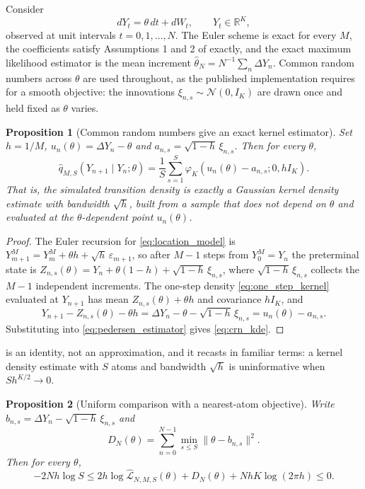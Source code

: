 \documentclass[11pt]{article}
\newtheorem{proposition}[proposition]{Proposition}
\theoremstyle{definition}
\newcommand{\R}{\mathbb{R}}
\newcommand{\Normal}{\mathcal{N}}
\newcommand{\phik}{\varphi_K}
\begin{document}
Consider
\begin{equation}\label{eq:location_model}
dY_t=\theta\,dt+dW_t,\qquad Y_t\in\R^K,
\end{equation}
observed at unit intervals $t=0,1,\ldots,N$. The Euler scheme is exact for every $M$, the coefficients satisfy Assumptions 1 and 2 of \citet{BrandtSantaClara2002} exactly, and the exact maximum likelihood estimator is the mean increment $\widehat\theta_N=N^{-1}\sum_n\Delta Y_n$. Common random numbers across $\theta$ are used throughout, as the published implementation requires for a smooth objective: the innovations $\xi_{n,s}\sim\Normal(0,I_K)$ are drawn once and held fixed as $\theta$ varies.

\begin{proposition}[Common random numbers give an exact kernel estimator]\label{prop:crn_kde}
Set $h=1/M$, $u_n(\theta)=\Delta Y_n-\theta$ and $a_{n,s}=\sqrt{1-h}\,\xi_{n,s}$. Then for every $\theta$,
\begin{equation}\label{eq:crn_kde}
\widehat q_{M,S}(Y_{n+1}\mid Y_n;\theta)
=\frac1S\sum_{s=1}^S\phik\!\left(u_n(\theta)-a_{n,s};0,hI_K\right).
\end{equation}
That is, the simulated transition density is exactly a Gaussian kernel density estimate with bandwidth $\sqrt h$, built from a sample that does not depend on $\theta$ and evaluated at the $\theta$-dependent point $u_n(\theta)$.
\end{proposition}

\begin{proof}
The Euler recursion for \eqref{eq:location_model} is $Y^M_{m+1}=Y^M_m+\theta h+\sqrt h\,\varepsilon_{m+1}$, so after $M-1$ steps from $Y^M_0=Y_n$ the preterminal state is $Z_{n,s}(\theta)=Y_n+\theta(1-h)+\sqrt{1-h}\,\xi_{n,s}$, where $\sqrt{1-h}\,\xi_{n,s}$ collects the $M-1$ independent increments. The one-step density \eqref{eq:one_step_kernel} evaluated at $Y_{n+1}$ has mean $Z_{n,s}(\theta)+\theta h$ and covariance $hI_K$, and
\[
Y_{n+1}-Z_{n,s}(\theta)-\theta h=\Delta Y_n-\theta-\sqrt{1-h}\,\xi_{n,s}=u_n(\theta)-a_{n,s}.
\]
Substituting into \eqref{eq:pedersen_estimator} gives \eqref{eq:crn_kde}.
\end{proof}

 is an identity, not an approximation, and it recasts  in familiar terms: a kernel density estimate with $S$ atoms and bandwidth $\sqrt h$ is uninformative when $Sh^{K/2}\to0$.

\begin{proposition}[Uniform comparison with a nearest-atom objective]\label{prop:nearest_atom}
Write $b_{n,s}=\Delta Y_n-\sqrt{1-h}\,\xi_{n,s}$ and
\[
D_N(\theta)=\sum_{n=0}^{N-1}\min_{s\le S}\lVert\theta-b_{n,s}\rVert^2 .
\]
Then for every $\theta$,
\begin{equation}\label{eq:nearest_atom_sandwich}
-2Nh\log S\le
2h\log\widehat{\mathcal L}_{N,M,S}(\theta)+D_N(\theta)+NhK\log(2\pi h)
\le 0 .
\end{equation}
\end{proposition}
\end{document}
